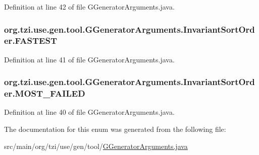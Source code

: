 Definition at line 42 of file G\-Generator\-Arguments.\-java.

\hypertarget{enumorg_1_1tzi_1_1use_1_1gen_1_1tool_1_1_g_generator_arguments_1_1_invariant_sort_order_a01be97387558ee41497c88fe12e583d6}{
\subsubsection[{F\-A\-S\-T\-E\-S\-T}]{\setlength{\rightskip}{0pt plus 5cm}org.\-tzi.\-use.\-gen.\-tool.\-G\-Generator\-Arguments.\-Invariant\-Sort\-Order.\-F\-A\-S\-T\-E\-S\-T}}\label{enumorg_1_1tzi_1_1use_1_1gen_1_1tool_1_1_g_generator_arguments_1_1_invariant_sort_order_a01be97387558ee41497c88fe12e583d6}


Definition at line 41 of file G\-Generator\-Arguments.\-java.

\hypertarget{enumorg_1_1tzi_1_1use_1_1gen_1_1tool_1_1_g_generator_arguments_1_1_invariant_sort_order_abfbf5e715a94e36166c15c1cd1d93316}{
\subsubsection[{M\-O\-S\-T\-\_\-\-F\-A\-I\-L\-E\-D}]{\setlength{\rightskip}{0pt plus 5cm}org.\-tzi.\-use.\-gen.\-tool.\-G\-Generator\-Arguments.\-Invariant\-Sort\-Order.\-M\-O\-S\-T\-\_\-\-F\-A\-I\-L\-E\-D}}\label{enumorg_1_1tzi_1_1use_1_1gen_1_1tool_1_1_g_generator_arguments_1_1_invariant_sort_order_abfbf5e715a94e36166c15c1cd1d93316}


Definition at line 40 of file G\-Generator\-Arguments.\-java.



The documentation for this enum was generated from the following file\-:\begin{DoxyCompactItemize}
\item 
src/main/org/tzi/use/gen/tool/\hyperlink{_g_generator_arguments_8java}{G\-Generator\-Arguments.\-java}\end{DoxyCompactItemize}
